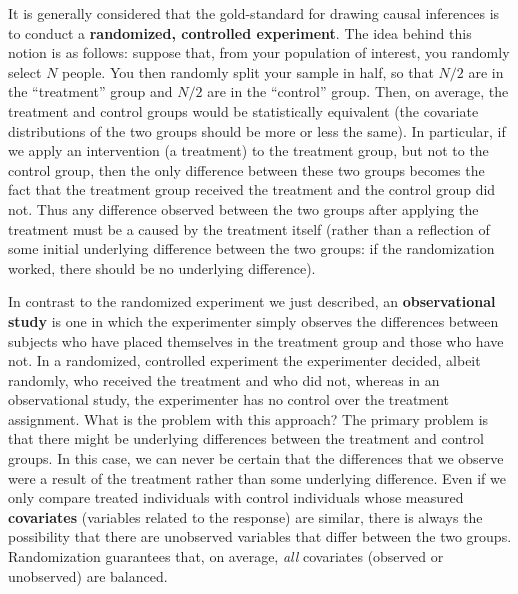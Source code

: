 It is generally considered that the gold-standard for drawing causal inferences is to conduct a \textbf{randomized, controlled experiment}. The idea behind this notion is as follows: suppose that, from your population of interest, you randomly select $N$ people. You then randomly split your sample in half, so that $N/2$ are in the ``treatment'' group and $N/2$ are in the ``control'' group. Then, on average, the treatment and control groups would be statistically equivalent (the covariate distributions of the two groups should be more or less the same). In particular, if we apply an intervention (a treatment) to the treatment group, but not to the control group, then the only difference between these two groups becomes the fact that the treatment group received the treatment and the control group did not. Thus any difference observed between the two groups after applying the treatment must be a caused by the treatment itself (rather than a reflection of some initial underlying difference between the two groups: if the randomization worked, there should be no underlying difference).

In contrast to the randomized experiment we just described, an \textbf{observational study} is one in which the experimenter simply observes the differences between subjects who have placed themselves in the treatment group and those who have not. In a randomized, controlled experiment the experimenter decided, albeit randomly, who received the treatment and who did not, whereas in an observational study, the experimenter has no control over the treatment assignment. What is the problem with this approach? The primary problem is that there might be underlying differences between the treatment and control groups. In this case, we can never be certain that the differences that we observe were a result of the treatment rather than some underlying difference. Even if we only compare treated individuals with control individuals whose measured \textbf{covariates} (variables related to the response) are similar, there is always the possibility that there are unobserved variables that differ between the two groups. Randomization guarantees that, on average, \textit{all} covariates (observed or unobserved) are balanced.

